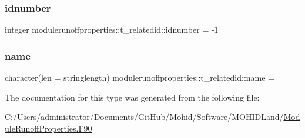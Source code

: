 \subsubsection{\texorpdfstring{idnumber}{idnumber}}
{\footnotesize\ttfamily integer modulerunoffproperties\+::t\+\_\+relatedid\+::idnumber = -\/1\hspace{0.3cm}{\ttfamily [private]}}

\mbox{\label{structmodulerunoffproperties_1_1t__relatedid_a16dc0becd33a4d868d3f6d97994e365a}} 
\subsubsection{\texorpdfstring{name}{name}}
{\footnotesize\ttfamily character(len = stringlength) modulerunoffproperties\+::t\+\_\+relatedid\+::name = \textquotesingle{}\textquotesingle{}\hspace{0.3cm}{\ttfamily [private]}}



The documentation for this type was generated from the following file\+:\begin{DoxyCompactItemize}
\item 
C\+:/\+Users/administrator/\+Documents/\+Git\+Hub/\+Mohid/\+Software/\+M\+O\+H\+I\+D\+Land/\mbox{\hyperlink{_module_runoff_properties_8_f90}{Module\+Runoff\+Properties.\+F90}}\end{DoxyCompactItemize}
